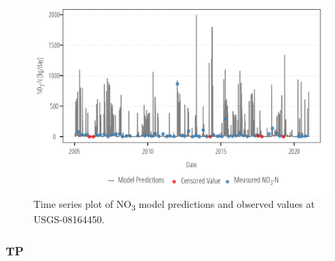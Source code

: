 \documentclass[
]{article}
\begin{document}
\begin{figure}[h]

{\centering \includegraphics{model_assessment_files/figure-pdf/unnamed-chunk-31-1.png}

}

\caption{Time series plot of NO\textsubscript{3} model predictions and
observed values at USGS-08164450.}

\end{figure}

\clearpage

\hypertarget{tp-2}{%
\subsubsection{TP}\label{tp-2}}
\end{document}
